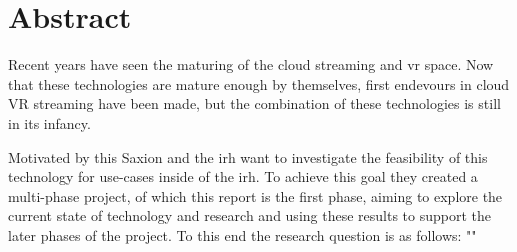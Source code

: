 
\section{Abstract}

Recent years have seen the maturing of the cloud streaming and \acrfull{vr} space. Now that these technologies are mature enough by themselves, first endevours in cloud VR streaming have been made, but the combination of these technologies is still in its infancy.

Motivated by this Saxion and the \acrfull{irh} want to investigate the feasibility of this technology for use-cases inside of the \acrshort{irh}. To achieve this goal they created a multi-phase project, of which this report is the first phase, aiming to explore the current state of technology and research and using these results to support the later phases of the project. To this end the research question is as follows: "\textit{}"

